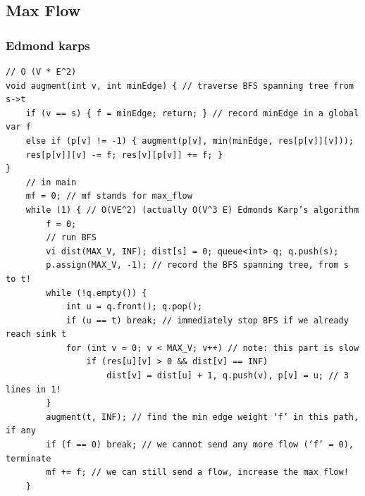 \documentclass[8pt, a4paper, oneside, twocolumn]{extarticle}
\begin{document}
\subsection{Max Flow}
\subsubsection{Edmond karps}
\begin{verbatim}
// O (V * E^2)
void augment(int v, int minEdge) { // traverse BFS spanning tree from s->t
    if (v == s) { f = minEdge; return; } // record minEdge in a global var f
    else if (p[v] != -1) { augment(p[v], min(minEdge, res[p[v]][v]));
    res[p[v]][v] -= f; res[v][p[v]] += f; }
}
    // in main
    mf = 0; // mf stands for max_flow
    while (1) { // O(VE^2) (actually O(V^3 E) Edmonds Karp’s algorithm
        f = 0;
        // run BFS
        vi dist(MAX_V, INF); dist[s] = 0; queue<int> q; q.push(s);
        p.assign(MAX_V, -1); // record the BFS spanning tree, from s to t!
        while (!q.empty()) {
            int u = q.front(); q.pop();
            if (u == t) break; // immediately stop BFS if we already reach sink t
            for (int v = 0; v < MAX_V; v++) // note: this part is slow
                if (res[u][v] > 0 && dist[v] == INF)
                    dist[v] = dist[u] + 1, q.push(v), p[v] = u; // 3 lines in 1!
        }
        augment(t, INF); // find the min edge weight ‘f’ in this path, if any
        if (f == 0) break; // we cannot send any more flow (‘f’ = 0), terminate
        mf += f; // we can still send a flow, increase the max flow!
    }
\end{verbatim}
\end{document}
